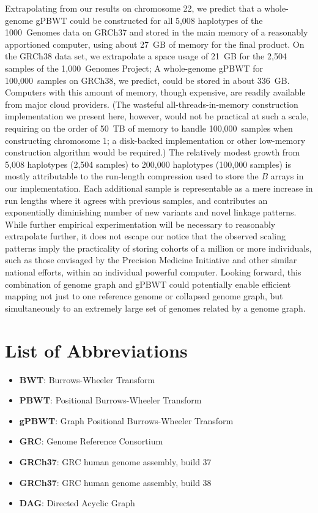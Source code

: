 \begin{sloppypar}
Extrapolating from our results on chromosome 22, we predict that a whole-genome gPBWT could be constructed for all 5,008 haplotypes of the 1000~Genomes data on GRCh37 and stored in the main memory of a reasonably apportioned computer, using about 27~GB of memory for the final product. On the GRCh38 data set, we extrapolate a space usage of 21~GB for the 2,504 samples of the 1,000~Genomes Project; A whole-genome gPBWT for 100,000~samples on GRCh38, we predict, could be stored in about 336~GB. Computers with this amount of memory, though expensive, are readily available from major cloud providers. (The wasteful all-threads-in-memory construction implementation we present here, however, would not be practical at such a scale, requiring on the order of 50~TB of memory to handle 100,000~samples when constructing chromosome 1; a disk-backed implementation or other low-memory construction algorithm would be required.) The relatively modest growth from 5,008 haplotypes (2,504 samples) to 200,000 haplotypes (100,000 samples) is mostly attributable to the run-length compression used to store the $B$ arrays in our implementation. Each additional sample is representable as a mere increase in run lengths where it agrees with previous samples, and contributes an exponentially diminishing number of new variants and novel linkage patterns. While further empirical experimentation will be necessary to reasonably extrapolate further, it does not escape our notice that the observed scaling patterns imply the practicality of storing cohorts of a million or more individuals, such as those envisaged by the Precision Medicine Initiative \cite{hudson2015precision} and other similar national efforts, within an individual powerful computer. Looking forward, this combination of genome graph and gPBWT could potentially enable efficient mapping not just to one reference genome or collapsed genome graph, but simultaneously to an extremely large set of genomes related by a genome graph.
\end{sloppypar}

\section{List of Abbreviations}
\begin{itemize}
\item \textbf{BWT}: Burrows-Wheeler Transform
\item \textbf{PBWT}: Positional Burrows-Wheeler Transform
\item \textbf{gPBWT}: Graph Positional Burrows-Wheeler Transform
\item \textbf{GRC}: Genome Reference Consortium
\item \textbf{GRCh37}: GRC human genome assembly, build 37
\item \textbf{GRCh37}: GRC human genome assembly, build 38
\item \textbf{DAG}: Directed Acyclic Graph
\end{itemize}


